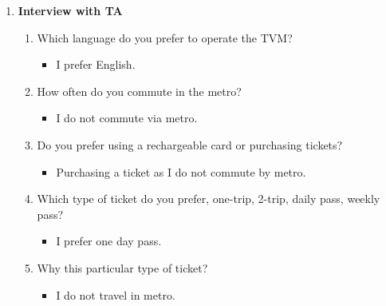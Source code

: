 \documentclass[15pt]{article}
\begin{document}
\begin{appendices}
\begin{enumerate}[leftmargin=3em, itemsep=0pt, parsep=0pt, , font=\Large\bfseries]
    
    \vspace{0.2cm}
    \item {\Large\bfseries Interview with TA}\\
    \begin{enumerate}[leftmargin=2em, itemsep=0pt, parsep=0pt, , font=\Large\bfseries]
        \item {\Large Which language do you prefer to operate the TVM?}
        \vspace{0.1cm}
            \begin{itemize}
                \item {\Large I prefer English.}
            \end{itemize}
            \vspace{0.2cm}
        \item {\Large How often do you commute in the metro?}
        \vspace{0.1cm}
            \begin{itemize}
                \item {\Large I do not commute via metro.}
            \end{itemize}
            \vspace{0.2cm}
        \item {\Large Do you prefer using a rechargeable card or purchasing tickets?}
        \vspace{0.1cm}
            \begin{itemize}
                \item {\Large  Purchasing a ticket as I do not commute by metro.}
            \end{itemize}
            \vspace{0.2cm}
        \item {\Large Which type of ticket do you prefer, one-trip, 2-trip, daily pass, weekly pass?}
        \vspace{0.1cm}
            \begin{itemize}
                \item {\Large I prefer one day pass.}
            \end{itemize}
            \vspace{0.2cm}
        \item {\Large Why this particular type of ticket?}
        \vspace{0.1cm}
            \begin{itemize}
                \item {\Large I do not travel in metro.}
            \end{itemize}

\end{enumerate}
\end{enumerate}
\end{appendices}
\end{document}
